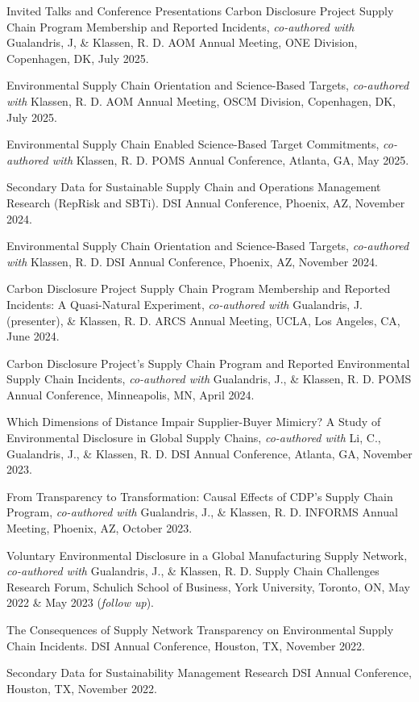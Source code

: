 \documentclass{resume} %
\begin{document}
\begin{rSection}{Invited Talks and Conference Presentations}
Carbon Disclosure Project Supply Chain Program Membership and Reported Incidents, \textit{co-authored with} Gualandris, J, \& Klassen, R. D. AOM Annual Meeting, ONE Division, Copenhagen, DK, July 2025.

Environmental Supply Chain Orientation and Science-Based Targets, {\em co-authored with} Klassen, R. D. AOM Annual Meeting, OSCM Division, Copenhagen, DK, July 2025.

Environmental Supply Chain Enabled Science-Based Target Commitments, {\em co-authored with} Klassen, R. D. POMS Annual Conference, Atlanta, GA, May 2025.

Secondary Data for Sustainable Supply Chain and Operations Management Research (RepRisk and SBTi). DSI Annual Conference, Phoenix, AZ, November 2024.

Environmental Supply Chain Orientation and Science-Based Targets, {\em co-authored with} Klassen, R. D. DSI Annual Conference, Phoenix, AZ, November 2024.

Carbon Disclosure Project Supply Chain Program Membership and Reported Incidents: A Quasi-Natural Experiment, {\em co-authored with} Gualandris, J. (presenter), \& Klassen, R. D. ARCS Annual Meeting, UCLA, Los Angeles, CA, June 2024.

Carbon Disclosure Project's Supply Chain Program and Reported Environmental Supply Chain Incidents, {\em co-authored with} Gualandris, J., \& Klassen, R. D. POMS Annual Conference, Minneapolis, MN, April 2024.

Which Dimensions of Distance Impair Supplier-Buyer Mimicry? A Study of Environmental Disclosure in Global Supply Chains, {\em co-authored with} Li, C., Gualandris, J., \& Klassen, R. D. DSI Annual Conference, Atlanta, GA, November 2023.

From Transparency to Transformation: Causal Effects of CDP’s Supply Chain Program, {\em co-authored with} Gualandris, J., \& Klassen, R. D. INFORMS Annual Meeting, Phoenix, AZ, October 2023.

Voluntary Environmental Disclosure in a Global Manufacturing Supply Network, {\em co-authored with} Gualandris, J., \& Klassen, R. D. Supply Chain Challenges Research Forum, Schulich School of Business, York University, Toronto, ON, May 2022 \& May 2023 (\textit{follow up}).

The Consequences of Supply Network Transparency on Environmental Supply Chain Incidents. DSI Annual Conference, Houston, TX, November 2022.

Secondary Data for Sustainability Management Research DSI Annual Conference, Houston, TX, November 2022.


\end{rSection}
\end{document}
